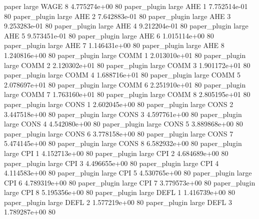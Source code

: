               paper      large     WAGE                 8 4.775274e+00 80
       paper_plugin      large      AHE                 1 7.752514e-01 80
       paper_plugin      large      AHE                 2 7.642883e-01 80
       paper_plugin      large      AHE                 3 9.253283e-01 80
       paper_plugin      large      AHE                 4 9.212204e-01 80
       paper_plugin      large      AHE                 5 9.573451e-01 80
       paper_plugin      large      AHE                 6 1.015114e+00 80
       paper_plugin      large      AHE                 7 1.146431e+00 80
       paper_plugin      large      AHE                 8 1.240816e+00 80
       paper_plugin      large     COMM                 1 2.013010e+01 80
       paper_plugin      large     COMM                 2 2.120302e+01 80
       paper_plugin      large     COMM                 3 1.901172e+01 80
       paper_plugin      large     COMM                 4 1.688716e+01 80
       paper_plugin      large     COMM                 5 2.078697e+01 80
       paper_plugin      large     COMM                 6 2.251910e+01 80
       paper_plugin      large     COMM                 7 1.763160e+01 80
       paper_plugin      large     COMM                 8 2.805195e+01 80
       paper_plugin      large     CONS                 1 2.602045e+00 80
       paper_plugin      large     CONS                 2 3.447518e+00 80
       paper_plugin      large     CONS                 3 4.597761e+00 80
       paper_plugin      large     CONS                 4 4.542080e+00 80
       paper_plugin      large     CONS                 5 3.889868e+00 80
       paper_plugin      large     CONS                 6 3.778158e+00 80
       paper_plugin      large     CONS                 7 5.474145e+00 80
       paper_plugin      large     CONS                 8 6.582932e+00 80
       paper_plugin      large      CPI                 1 4.152713e+00 80
       paper_plugin      large      CPI                 2 4.684689e+00 80
       paper_plugin      large      CPI                 3 4.496655e+00 80
       paper_plugin      large      CPI                 4 4.114583e+00 80
       paper_plugin      large      CPI                 5 4.530765e+00 80
       paper_plugin      large      CPI                 6 4.789319e+00 80
       paper_plugin      large      CPI                 7 3.779573e+00 80
       paper_plugin      large      CPI                 8 5.195356e+00 80
       paper_plugin      large     DEFL                 1 1.416739e+00 80
       paper_plugin      large     DEFL                 2 1.577219e+00 80
       paper_plugin      large     DEFL                 3 1.789287e+00 80
